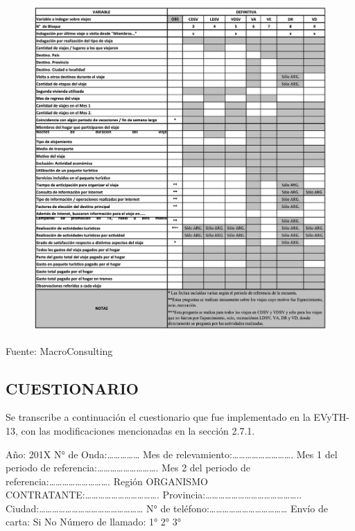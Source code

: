 \documentclass[
  openany]{book}
\begin{document}
\begin{figure}

{\centering \includegraphics[width=1\linewidth]{imagenes/figura6-151} 

}

\end{figure}

Fuente: MacroConsulting

\hypertarget{cuestionario-1}{%
\subsection{\texorpdfstring{\textbf{CUESTIONARIO}}{CUESTIONARIO}}\label{cuestionario-1}}

Se transcribe a continuación el cuestionario que fue implementado en la EVyTH-13, con las modificaciones mencionadas en la sección 2.7.1.

Año: 201X
N° de Onda:\ldots\ldots\ldots\ldots\ldots{}
Mes de relevamiento:\ldots\ldots\ldots\ldots\ldots\ldots\ldots\ldots\ldots.
Mes 1 del periodo de referencia:\ldots\ldots\ldots\ldots\ldots\ldots\ldots\ldots\ldots.
Mes 2 del periodo de referencia:\ldots\ldots\ldots\ldots\ldots\ldots\ldots\ldots\ldots.
Región ORGANISMO CONTRATANTE:\ldots\ldots\ldots\ldots\ldots\ldots\ldots\ldots\ldots\ldots\ldots.
Provincia:\ldots\ldots\ldots\ldots\ldots\ldots\ldots\ldots\ldots\ldots\ldots\ldots\ldots\ldots..
Ciudad:\ldots\ldots\ldots\ldots\ldots\ldots\ldots\ldots\ldots\ldots\ldots\ldots\ldots\ldots\ldots\ldots{}
N° de teléfono:\ldots\ldots\ldots\ldots\ldots\ldots\ldots\ldots\ldots\ldots\ldots\ldots{}
Envío de carta: Si No
Número de llamado: 1° 2° 3°
\end{document}
